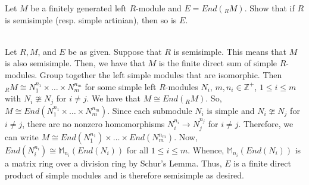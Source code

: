 Let $M$ be a finitely generated left $R$-module and $E=End(_RM)$. Show that if $R$ is semisimple
(resp. simple artinian), then so is $E$.\\

\begin{solution}\renewcommand{\qedsymbol}{}\ \\
    Let $R, M$, and $E$ be as given. Suppose that $R$ is semisimple. This means that $M$ is also
    semisimple. Then, we have that $M$ is the finite direct sum of simple $R$-modules. Group together
    the left simple modules that are isomorphic. Then $_RM\cong N^{n_1}_1\times\ldots\times N^{n_m}_m$
    for some simple left $R$-modules $N_i$, $m,n_i\in\mathbb{Z}^+$, $1\leq i\leq m$ with $N_i\ncong N_j$
    for $i\neq j$. We have that $M\cong End(_RM)$. So,
    $M\cong End(N^{n_1}_1\times\ldots\times N^{n_m}_m)$. Since each submodule $N_i$ is simple and
    $N_i\ncong N_j$ for $i\neq j$, there are no nonzero homomorphisms $N^{n_i}_i\rightarrow N^{n_j}_j$
    for $i\neq j$. Therefore, we can write $M\cong End(N^{n_1}_1)\times\ldots\times End(N^{n_m}_m)$.
    Now, $End(N^{n_i}_i)\cong\mathbb{M}_{n_i}(End(N_i))$ for all $1\leq i\leq m$. Whence,
    $\mathbb{M}_{n_i}(End(N_i))$ is a matrix ring over a division ring by Schur's Lemma. Thus, $E$ is a
    finite direct product of simple modules and is therefore semisimple as desired.

\end{solution}